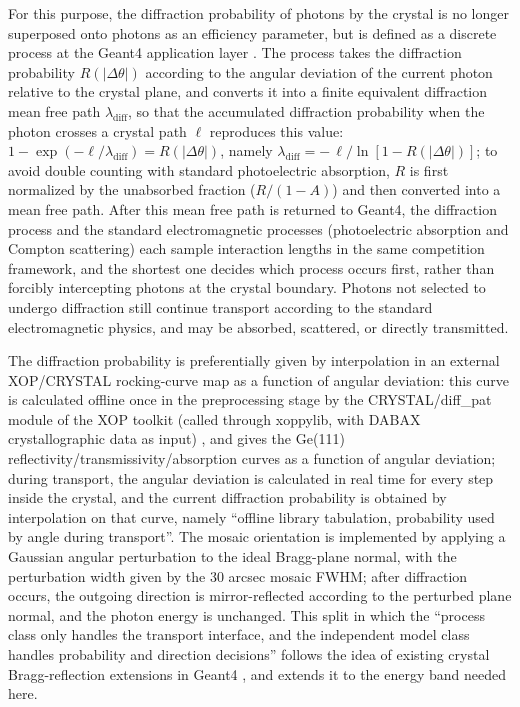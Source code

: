 \documentclass[11pt]{article}
\begin{document}
For this purpose, the diffraction probability of photons by the crystal is no longer superposed onto photons as an efficiency parameter, but is defined as a discrete process at the Geant4 application layer \cite{Agostinelli2003,Allison2016}. The process takes the diffraction probability $R(|\Delta\theta|)$ according to the angular deviation of the current photon relative to the crystal plane, and converts it into a finite equivalent diffraction mean free path $\lambda_{\mathrm{diff}}$, so that the accumulated diffraction probability when the photon crosses a crystal path $\ell$ reproduces this value: $1-\exp(-\ell/\lambda_{\mathrm{diff}})=R(|\Delta\theta|)$, namely $\lambda_{\mathrm{diff}}=-\,\ell/\ln[1-R(|\Delta\theta|)]$; to avoid double counting with standard photoelectric absorption, $R$ is first normalized by the unabsorbed fraction ($R/(1-A)$) and then converted into a mean free path. After this mean free path is returned to Geant4, the diffraction process and the standard electromagnetic processes (photoelectric absorption and Compton scattering) each sample interaction lengths in the same competition framework, and the shortest one decides which process occurs first, rather than forcibly intercepting photons at the crystal boundary. Photons not selected to undergo diffraction still continue transport according to the standard electromagnetic physics, and may be absorbed, scattered, or directly transmitted.

The diffraction probability is preferentially given by interpolation in an external XOP/CRYSTAL rocking-curve map as a function of angular deviation: this curve is calculated offline once in the preprocessing stage by the CRYSTAL/diff\_pat module of the XOP toolkit (called through xoppylib, with DABAX crystallographic data as input) \cite{SanchezDelRio2011XOP}, and gives the Ge(111) reflectivity/transmissivity/absorption curves as a function of angular deviation; during transport, the angular deviation is calculated in real time for every step inside the crystal, and the current diffraction probability is obtained by interpolation on that curve, namely ``offline library tabulation, probability used by angle during transport''. The mosaic orientation is implemented by applying a Gaussian angular perturbation to the ideal Bragg-plane normal, with the perturbation width given by the 30 arcsec mosaic FWHM; after diffraction occurs, the outgoing direction is mirror-reflected according to the perturbed plane normal, and the photon energy is unchanged. This split in which the ``process class only handles the transport interface, and the independent model class handles probability and direction decisions'' follows the idea of existing crystal Bragg-reflection extensions in Geant4 \cite{Guan2023BraggReflection,Reiazi2025G4BraggReflection}, and extends it to the energy band needed here.
\end{document}

